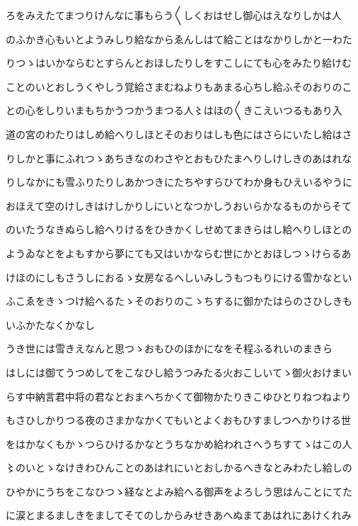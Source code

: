 \documentclass[a4paper,11pt,landscape]{ltjtarticle}
\begin{document}
\par\medskip
ろをみえたてまつりけんなに事もらう〱しくおはせし御心はえなりしかは人
\par\medskip
のふかき心もいとようみしり給なからゑんしはて給ことはなかりしかと一わた
\par\medskip
りつゝはいかならむとすらんとおほしたりしをすこしにても心をみたり給けむ
\par\medskip
ことのいとおしうくやしう覚給さまむねよりもあまる心ちし給ふそのおりのこ
\par\medskip
との心をしりいまもちかうつかうまつる人〻はほの〱きこえいつるもあり入
\par\medskip
道の宮のわたりはしめ給へりしほとそのおりはしも色にはさらにいたし給はさ
\par\medskip
りしかと事にふれつゝあちきなのわさやとおもひたまへりしけしきのあはれな
\par\medskip
りしなかにも雪ふりたりしあかつきにたちやすらひてわか身もひえいるやうに
\par\medskip
おほえて空のけしきはけしかりしにいとなつかしうおいらかなるものからそて
\par\medskip
のいたうなきぬらし給へりけるをひきかくしせめてまきらはし給へりしほとの
\par\medskip
ようゐなとをよもすから夢にても又はいかならむ世にかとおほしつゝけらるあ
\par\medskip
けほのにしもさうしにおるゝ女房なるへしいみしうもつもりにける雪かなとい
\par\medskip
ふこゑをきゝつけ給へるたゝそのおりのこゝちするに御かたはらのさひしきも
\par\medskip
いふかたなくかなし
\par\medskip
うき世には雪きえなんと思つゝおもひのほかになをそ程ふるれいのまきら
\par\medskip
はしには御てうつめしてをこなひし給うつみたる火おこしいてゝ御火おけまい
\par\medskip
らす中納言君中将の君なとおまへちかくて御物かたりきこゆひとりねつねより
\par\medskip
もさひしかりつる夜のさまかなかくてもいとよくおもひすましつへかりける世
\par\medskip
をはかなくもかゝつらひけるかなとうちなかめ給われさへうちすてゝはこの人
\par\medskip
〻のいとゝなけきわひんことのあはれにいとおしかるへきなとみわたし給しの
\par\medskip
ひやかにうちをこなひつゝ経なとよみ給へる御声をよろしう思はんことにてた
\par\medskip
に涙とまるましきをましてそてのしからみせきあへぬまてあはれにあけくれみ
\end{document}
